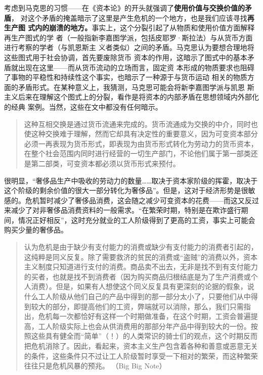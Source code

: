 考虑到马克思的习惯——在《资本论》的开头就强调了\textbf{使用价值与交换价值的矛盾}，
对这个矛盾的掩盖暗示了这里是产生危机的一个地方，也是我们应该寻找\textbf{再生产图
  式内的崩溃的地方。}事实上，这个分裂引起了从物质和使用价值方面解释再生产图式的学
者（一般指新李嘉图学派，包括皮耶罗·斯拉法）与从货币方面进行考察的学者（与凯恩斯主
义者类似）之间的矛盾。马克思认为要想合理地将这些图式用于社会协调，首先要废除货币
资本的作用，这暗示了图式中的基本矛盾就出现在这里——而从货币流动的立场而言，固定资
本形成的物质要求也阻碍了事物的平稳性和持续性这个事实，也暗示了一种源于与货币运动
相关的物质方面的矛盾形式。在某种意义上，我猜测，马克思可能会将新李嘉图学派与凯恩
斯主义后来在理解这个图式上的分裂，看作是将资本的内部矛盾在思想领域内外部化的经典
案例。当然，这些在文中都没有任何暗示。

\begin{quotation}
这种互相交换是通过货币流通来完成的。货币流通成为交换的中介，同时也使这种交换难于理解，然而它却具有决定性的重要意义，因为可变资本部分必须一再表现为货币形式，即表现为由货币形式转化为劳动力的货币资本，在整个社会范围内同时进行经营的一切生产部门，不论他们属于第一部类还是第二部类，可变资本都必须以货币形式来预付。 

\end{quotation}

很明显，“奢侈品生产中吸收的劳动力的数量……取决于资本家阶级的挥霍，取决于这个阶级的剩余价值的很大一部分转化为奢侈品”。但是，这对于经济形势是很敏感的。危机暂时减少了奢侈品消费，这会随之减少可变资本的花费——而这又反过来减少了对非奢侈品消费资料的一般需求。“在繁荣时期，特别是在欺诈盛行期间，情况正好相反”，这时充分就业的工人阶级得到了更高的工资，事实上可能会购买少量的奢侈品。

\begin{quotation}
认为危机是由于缺少有支付能力的消费或缺少有支付能力的消费者引起的，这纯粹是同义反复。除了需要救济的贫民的消费或“盗贼”的消费以外，资本主义制度只知道进行支付的消费。商品卖不出去，无非是找不到有支付能力的买者，也就是找不到消费者（因为购买商品归根结底是为了生产消费或个人消费）。但是，如果有人想使这个同义反复具有更深刻的论据的假象，说什么工人阶级从他们自己的产品中得到的那一部分太小了，只要他们从中得到较大的部分，即提高他们的工资，弊端就可以消除，那么，我们只需指出，危机每一次都恰好有这样一个时期做准备，在这个时期，工资会普遍提高，工人阶级实际上也会从供消费用的那部分年产品中得到较大的一份。按照这些具有健全而“简单”（！）的人类常识的骑士们的观点，这个时期反而把危机消除了。因此，看起来，资本主义生产包含着各种和善意或恶意无关的条件，这些条件只不过让工人阶级暂时享受一下相对的繁荣，而这种繁荣往往只是危机风暴的预兆。 （Big Big Note）
\end{quotation}

